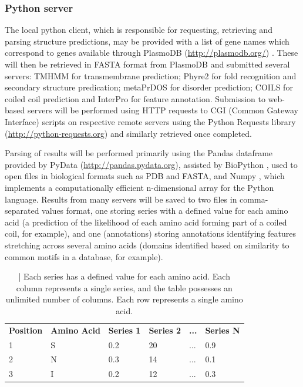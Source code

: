 \documentclass[fleqn,10pt]{article} %
\begin{document}
\subsubsection{Python server}

The local python client, which is responsible for requesting, retrieving and parsing structure predictions, may be provided with a list of gene names which correspond to genes available through PlasmoDB (\url{http://plasmodb.org/}) \cite{Aurrecoechea2009}. These will then be retrieved in FASTA format from PlasmoDB and submitted several servers: TMHMM for transmembrane prediction; Phyre2 for fold recognition and secondary structure predication; metaPrDOS for disorder prediction; COILS for coiled coil prediction and InterPro for feature annotation. Submission to web-based servers will be performed using HTTP requests to CGI (Common Gateway Interface) scripts on respective remote servers using the Python Requests library (\url{http://python-requests.org}) and similarly retrieved once completed.

Parsing of results will be performed primarily using the Pandas dataframe provided by PyData (\url{http://pandas.pydata.org}), assisted by BioPython \cite{Cock2009}, used to open files in biological formats such as PDB and FASTA, and Numpy \cite{VanderWalt2011}, which implements a computationally efficient n-dimensional array for the Python language. Results from many servers will be saved to two files in comma-separated values format, one storing series with a defined value for each amino acid (a prediction of the likelihood of each amino acid forming part of a coiled coil, for example), and one (annotations) storing annotations identifying features stretching across several amino acids (domains identified based on similarity to common motifs in a database, for example).

\begin{table}[h]
\begin{tabular}{llllll}
\textbf{Position} & \textbf{Amino Acid} & \textbf{Series 1} & \textbf{Series 2} & \textbf{...} & \textbf{Series N} \\
1                 & S                   & 0.2               & 20                & ...          & 0.9               \\
2                 & N                   & 0.3               & 14                & ...          & 0.1               \\
3                 & I                   & 0.2               & 12                & ...          & 0.3              
\end{tabular}
\caption{ | Each series has a defined value for each amino acid. Each column represents a single series, and the table possesses an unlimited number of columns. Each row represents a single amino acid.}
\end{table}
\end{document}
